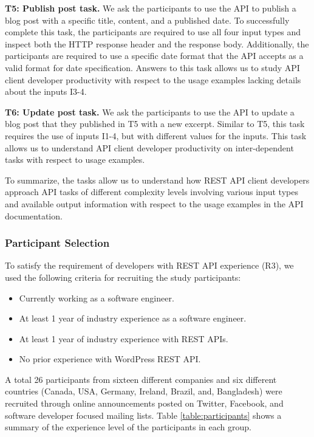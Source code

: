 \documentclass[conference]{IEEEtran}
\begin{document}
\textbf{T5: Publish post task.} We ask the participants to use the API to publish a blog post with a specific title, content, and a published date. To successfully complete this task, the participants are required to use all four input types and inspect both the HTTP response header and the response body. Additionally, the participants are required to use a specific date format that the API accepts as a valid format for date specification. Answers to this task allows us to study API client developer productivity with respect to the usage examples lacking details about the inputs I3-4.

\textbf{T6: Update post task.} We ask the participants to use the API to update a blog post that they published in T5 with a new excerpt. Similar to T5, this task requires the use of inputs I1-4, but with different values for the inputs. This task allows us to understand API client developer productivity on inter-dependent tasks with respect to usage examples.

To summarize, the tasks allow us to understand how REST API client developers approach API tasks of different complexity levels involving various input types and available output information with respect to the usage examples in the API documentation.

\subsubsection{Participant Selection} %

To satisfy the requirement of developers with REST API experience (R3), we used the following criteria for recruiting the study participants:

\begin{itemize}
  \item Currently working as a software engineer.
  \item At least 1 year of industry experience as a software engineer.
  \item At least 1 year of industry experience with REST APIs.
  \item No prior experience with WordPress REST API.
\end{itemize}

A total 26 participants from sixteen different companies and six different countries (Canada, USA, Germany, Ireland, Brazil, and,
Bangladesh) were recruited through online announcements posted on Twitter, Facebook, and software developer focused mailing lists. Table \ref{table:participants} shows a summary of the experience level of the participants in each group.
\end{document}
